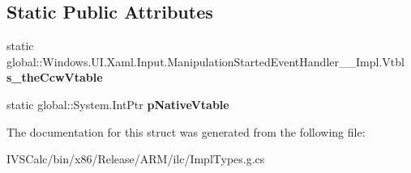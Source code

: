 \subsection*{Static Public Attributes}
\begin{DoxyCompactItemize}
\item 
\mbox{\label{struct_windows_1_1_u_i_1_1_xaml_1_1_input_1_1_manipulation_started_event_handler_____impl_1_1_vtbl_a7ecdbc54d43abcc2deb0876ee5cb3ceb}} 
static global\+::\+Windows.\+U\+I.\+Xaml.\+Input.\+Manipulation\+Started\+Event\+Handler\+\_\+\+\_\+\+Impl.\+Vtbl {\bfseries s\+\_\+the\+Ccw\+Vtable}
\item 
\mbox{\label{struct_windows_1_1_u_i_1_1_xaml_1_1_input_1_1_manipulation_started_event_handler_____impl_1_1_vtbl_a43277b275a46057a03b8cf238ee9c17e}} 
static global\+::\+System.\+Int\+Ptr {\bfseries p\+Native\+Vtable}
\end{DoxyCompactItemize}


The documentation for this struct was generated from the following file\+:\begin{DoxyCompactItemize}
\item 
I\+V\+S\+Calc/bin/x86/\+Release/\+A\+R\+M/ilc/Impl\+Types.\+g.\+cs\end{DoxyCompactItemize}
